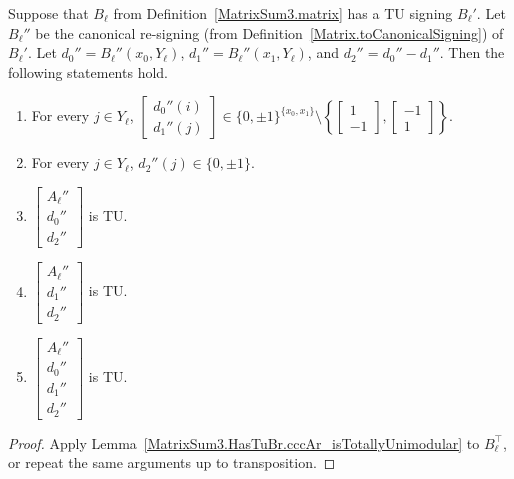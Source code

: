 \begin{lemma}
    \label{MatrixSum3.HasTuBr.dddAl_isTotallyUnimodular}
    \leanok
    Suppose that $B_{\ell}$ from Definition~\ref{MatrixSum3.matrix} has a TU signing $B_{\ell}'$. Let $B_{\ell}''$ be the canonical re-signing (from Definition~\ref{Matrix.toCanonicalSigning}) of $B_{\ell}'$. Let $d_{0}'' = B_{\ell}'' (x_{0}, Y_{\ell})$, $d_{1}'' = B_{\ell}'' (x_{1}, Y_{\ell})$, and $d_{2}'' = d_{0}'' - d_{1}''$. Then the following statements hold.
    \begin{enumerate}
        \item\label{item:tss_Blp_d01} For every $j \in Y_{\ell}$, $\begin{bmatrix} d_{0}'' (i) \\ d_{1}'' (j) \end{bmatrix} \in \{0, \pm 1\}^{\{x_{0}, x_{1}\}} \setminus \left\{ \begin{bmatrix} 1 \\ -1 \end{bmatrix}, \begin{bmatrix} -1 \\ 1 \end{bmatrix} \right\}$.
        \item\label{item:tss_Blp_d2} For every $j \in Y_{\ell}$, $d_{2}'' (j) \in \{0, \pm 1\}$.
        \item\label{item:tss_Blp_tu1} $\begin{bmatrix} A_{\ell}'' \\ d_{0}'' \\ d_{2}'' \end{bmatrix}$ is TU.
        \item\label{item:tss_Blp_tu2} $\begin{bmatrix} A_{\ell}'' \\ d_{1}'' \\ d_{2}'' \end{bmatrix}$ is TU.
        \item\label{item:tss_Blp_tu3} $\begin{bmatrix} A_{\ell}'' \\ d_{0}'' \\ d_{1}'' \\ d_{2}'' \end{bmatrix}$ is TU.
    \end{enumerate}
\end{lemma}

\begin{proof}
    \leanok
    Apply Lemma~\ref{MatrixSum3.HasTuBr.cccAr_isTotallyUnimodular} to $B_{\ell}^{\top}$, or repeat the same arguments up to transposition.
\end{proof}

